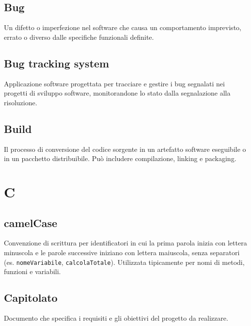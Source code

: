 \documentclass[a4paper, 11pt, oneside]{scrartcl} %
\begin{document}
\subsection*{Bug}
Un difetto o imperfezione nel software che causa un comportamento imprevisto, errato o diverso dalle specifiche funzionali definite.
\vspace{0.5cm}

\subsection*{Bug tracking system}
Applicazione software progettata per tracciare e gestire i bug segnalati nei progetti di sviluppo software, monitorandone lo stato dalla segnalazione alla risoluzione.
\vspace{0.5cm}

\subsection*{Build}
Il processo di conversione del codice sorgente in un artefatto software eseguibile o in un pacchetto distribuibile. Può includere compilazione, linking e packaging.
\vspace{0.5cm}


\section*{C}


\subsection*{camelCase}
Convenzione di scrittura per identificatori in cui la prima parola inizia con lettera minuscola e le parole successive iniziano con lettera maiuscola, senza separatori (es. \texttt{nomeVariabile}, \texttt{calcolaTotale}). Utilizzata tipicamente per nomi di metodi, funzioni e variabili.
\vspace{0.5cm}

\subsection*{Capitolato}
Documento che specifica i requisiti e gli obiettivi del progetto da realizzare.
\vspace{0.5cm}
\end{document}
